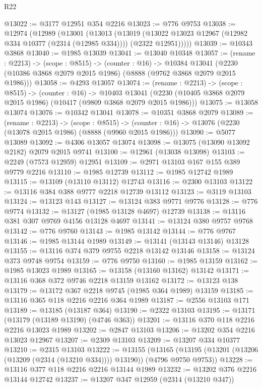 \begin{lexlean}{R22}
\begin{coremodule}
@13022 := @3177 @12951 @354 @2216
@13023 := @776 @9753
@13038 := @12974
    (@12989
      (@13001
        (@13013
          (@13019
            (@13022 @13023 @12967 (@12982 @334 @10377 (@2314 (@12985 @334))))
            (@2322 @12951)))))
@13039 := @10343 @3868
@13040 := @1985 @13039
@13041 := @13040 @10348
@13057 := (rename : @2213) ->
  (scope : @8515) ->
  (counter : @16) ->
  @10384 @13041 (@2230 (@10386 @3868 @2079 @2015 @1986) (@8888 (@9762 @3868 @2079 @2015 @1986)))
@13058 := @4293 @13057
@13074 := (rename : @2213) ->
  (scope : @8515) ->
  (counter : @16) ->
  @10403 @13041 (@2230 (@10405 @3868 @2079 @2015 @1986) (@10417 (@9809 @3868 @2079 @2015 @1986)))
@13075 := @13058 @13074
@13076 := @10342 @13041
@13078 := @10351 @3868 @2079
@13089 := (rename : @2213) ->
  (scope : @8515) ->
  (counter : @16) -> @13076 (@2230 (@13078 @2015 @1986) (@8888 (@9960 @2015 @1986)))
@13090 := @5077 @13089
@13092 := @4306 @13057 @13074
@13098 := @13075 (@13090 @13092 @2182) @2079 @2015 @9741
@13100 := @12961 (@13038 @13098)
@13103 := @2249 (@7573 @12959) @12951
@13109 := @2971 @13103 @167 @155 @389 @9779 @2216
@13110 := @1985 @12739
@13112 := @1985 @12742 @1989
@13115 := @13109 (@13110 @13112) @12743
@13116 := @2300 @13103
@13122 := @13116 @384 @388 @9777 @2218 @12739 @13112
@13123 := @3119 @13103
@13124 := @13123 @143
@13127 := @13124 @383 @9771 @9776
@13128 := @776 @9774
@13132 := @13127 (@1985 @13128 @4697) @12739
@13138 := @13116 @381 @307 @9769 @4156 @13128 @4697
@13141 := @13124 @380 @9757 @9768
@13142 := @776 @9760
@13143 := @1985 @13142
@13144 := @776 @9767
@13146 := @1985 @13144 @1989
@13149 := @13141 (@13143 @13146) @13128
@13155 := @13116 @374 @379 @9755 @2218 @13142 @13146
@13158 := @13124 @373 @9748 @9754
@13159 := @776 @9750
@13160 := @1985 @13159
@13162 := @1985 @13023 @1989
@13165 := @13158 (@13160 @13162) @13142
@13171 := @13116 @368 @372 @9746 @2218 @13159 @13162
@13172 := @13123 @138
@13179 := @13172 @367 @2218 @9745 (@1985 @364 @1989) @13159
@13185 := @13116 @365 @118 @2216 @2216 @364 @1989
@13187 := @2556 @13103 @171
@13189 := @13185 (@13187 @364)
@13190 := @2322 @13103
@13195 := @13171 (@13179 (@13189 @13190) (@4746 @363))
@13201 := @13116 @370 @118 @2216 @2216 @13023 @1989
@13202 := @2847 @13103
@13206 := @13202 @354 @2216 @13023 @12967
@13207 := @2309 @13103
@13209 := @13207 @334 @10377
@13210 := @2315 @13103
@13222 := @13155
    (@13165 (@13195 (@13201 (@13206 (@13209 (@2314 (@13210 @334)))) @13190)) (@4796 @9750 @9753))
@13228 := @13116 @377 @118 @2216 @2216 @13144 @1989
@13232 := @13202 @376 @2216 @13144 @12742
@13237 := @13207 @347 @12959 (@2314 (@13210 @347))

\end{coremodule}
\end{lexlean}
